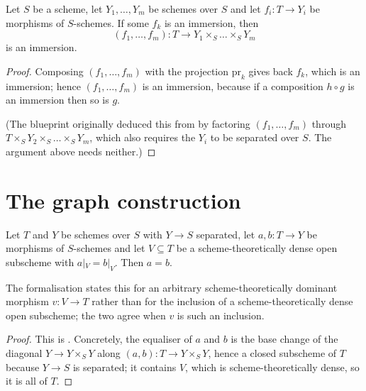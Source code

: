 \begin{lemma}\label{lem:chow-tuple-immersion}
\leanok
Let $S$ be a scheme, let $Y_1,\dots,Y_m$ be schemes over $S$ and let
$f_i\colon T\to Y_i$ be morphisms of $S$-schemes.  If some $f_k$ is an
immersion, then
\[
  (f_1,\dots,f_m)\colon T\longrightarrow Y_1\times_S\dots\times_S Y_m
\]
is an immersion.
\end{lemma}
\begin{proof}
\leanok
Composing $(f_1,\dots,f_m)$ with the projection $\mathrm{pr}_k$ gives back
$f_k$, which is an immersion; hence $(f_1,\dots,f_m)$ is an immersion, because
if a composition $h\circ g$ is an immersion then so is $g$.

(The blueprint originally deduced this from  by factoring
$(f_1,\dots,f_m)$ through $T\times_S Y_2\times_S\dots\times_S Y_m$, which also
requires the $Y_i$ to be separated over $S$.  The argument above needs neither.)
\end{proof}

\section{The graph construction}\label{sec:chow-graph}

\begin{lemma}
\label{lem:chow-agree-on-dense-open}
\leanok
Let $T$ and $Y$ be schemes over $S$ with $Y\to S$ separated, let
$a,b\colon T\to Y$ be morphisms of $S$-schemes and let $V\subseteq T$ be a
scheme-theoretically dense open subscheme with $a|_V=b|_V$.  Then $a=b$.

The formalisation states this for an arbitrary scheme-theoretically dominant
morphism $v\colon V\to T$ rather than for the inclusion of a
scheme-theoretically dense open subscheme; the two agree when $v$ is such an
inclusion.
\end{lemma}
\begin{proof}
\leanok
This is .  Concretely, the equaliser of $a$ and $b$ is the
base change of the diagonal $Y\to Y\times_S Y$ along
$(a,b)\colon T\to Y\times_S Y$, hence a closed subscheme of $T$ because
$Y\to S$ is separated; it contains $V$, which is scheme-theoretically dense, so
it is all of $T$.
\end{proof}

